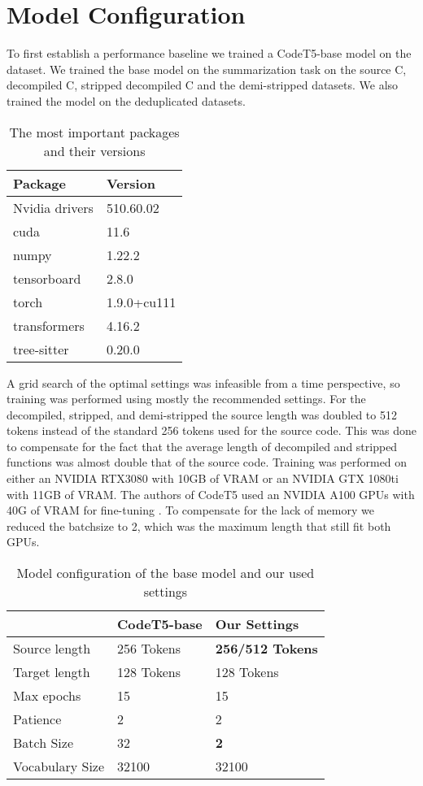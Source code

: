 \section{Model Configuration}
To first establish a performance baseline we trained a CodeT5-base model on the dataset. We trained the base model on the summarization task on the source C, decompiled C, stripped decompiled C and the demi-stripped datasets. We also trained the model on the deduplicated datasets.

\label{tab:packages}
\begin{table}[!h]
\centering
\begin{tabular}{ll}
\hline
Package        & Version     \\ \hline
Nvidia drivers & 510.60.02   \\
cuda           & 11.6        \\
numpy          & 1.22.2      \\
tensorboard    & 2.8.0       \\
torch          & 1.9.0+cu111 \\
transformers   & 4.16.2      \\
tree-sitter    & 0.20.0      \\ \hline
\end{tabular}
\caption{The most important packages and their versions}
\end{table}

A grid search of the optimal settings was infeasible from a time perspective, so training was performed using mostly the recommended settings. For the decompiled, stripped, and demi-stripped the source length was doubled to 512 tokens instead of the standard 256 tokens used for the source code. This was done to compensate for the fact that the average length of decompiled and stripped functions was almost double that of the source code. Training was performed on either an NVIDIA RTX3080 with 10GB of VRAM or an NVIDIA GTX 1080ti with 11GB of VRAM. The authors of CodeT5 used an NVIDIA A100 GPUs with 40G of VRAM for fine-tuning \cite{CodeT5}. To compensate for the lack of memory we reduced the batchsize to 2, which was the maximum length that still fit both GPUs.

\label{tab:modelSettings}
\begin{table}[!h]
\centering
\begin{tabular}{l|ll}
\hline
                & CodeT5-base & Our Settings            \\ \hline
Source length   & 256 Tokens  & \textbf{256/512 Tokens} \\
Target length   & 128 Tokens  & 128 Tokens              \\
Max epochs      & 15          & 15                      \\
Patience        & 2           & 2                       \\
Batch Size      & 32          & \textbf{2}              \\
Vocabulary Size & 32100       & 32100                  
\end{tabular}
\caption{Model configuration of the base model and our used settings}
\end{table}

